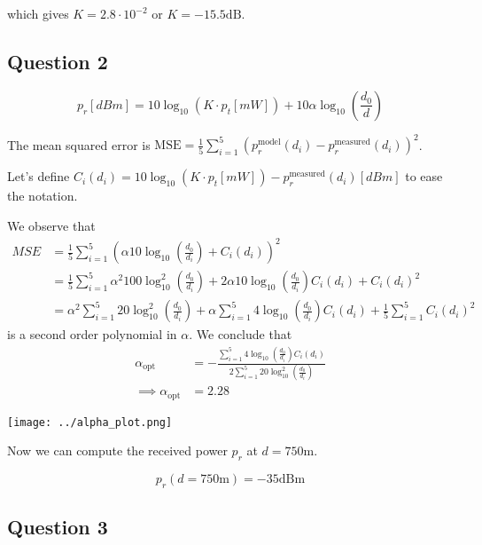 \documentclass[]{article}
\begin{document}
	which gives $K = 2.8 \cdot 10^{-2}$ or $K = -15.5 \mathrm{dB}$.
	
	\subsection*{Question 2}
	
	\begin{equation}
		p_r[dBm] = 10\log_{10}(K \cdot p_t[mW]) + 10\alpha\log_{10}\left(\frac{d_0}{d}\right)
	\end{equation}
	
	The mean squared error is $\mathrm{MSE} = \frac{1}{5}\sum_{i=1}^{5} \left(p_r^{\mathrm{model}}(d_i) - p_r^{\mathrm{measured}}(d_i)\right)^2$.
	
	Let's define $C_i(d_i) = 10\log_{10}(K \cdot p_t[mW]) - p_r^{\mathrm{measured}}(d_i)[dBm]$ to ease the notation.
	
	We observe that 
	\begin{align}
		MSE &= \frac{1}{5}\sum_{i=1}^{5} \left( \alpha10\log_{10}\left(\frac{d_0}{d_i}\right) + C_i(d_i) \right)^2 \\
		&= \frac{1}{5}\sum_{i=1}^{5} \alpha^2 100 \log_{10}^2\left(\frac{d_0}{d_i}\right) + 2\alpha 10 \log_{10}\left(\frac{d_0}{d_i}\right) C_i(d_i) + C_i(d_i)^2 \\
		&= \alpha^2 \sum_{i=1}^{5} 20\log_{10}^2\left(\frac{d_0}{d_i}\right) + \alpha \sum_{i=1}^{5} 4 \log_{10}\left(\frac{d_0}{d_i}\right)C_i(d_i) + \frac{1}{5}\sum_{i=1}^{5} C_i(d_i)^2
	\end{align}
	is a second order polynomial in $\alpha$. We conclude that
	\begin{align}
		\alpha_{\mathrm{opt}} &= -\frac{\sum_{i=1}^{5} 4\log_{10}\left(\frac{d_0}{d_i}\right)C_i(d_i)}{2\sum_{i=1}^{5} 20\log_{10}^2\left(\frac{d_0}{d_i}\right)} \\
		\implies \alpha_{\mathrm{opt}} &= 2.28
	\end{align}
	
	\texttt{[image: ../alpha\_plot.png]}
	
	Now we can compute the received power $p_r$ at $d = 750\mathrm{m}$.
	
	\begin{equation}
		p_r(d=750\mathrm{m}) = -35 \mathrm{dBm}
	\end{equation}
	
	\subsection*{Question 3}
	
\end{document}
